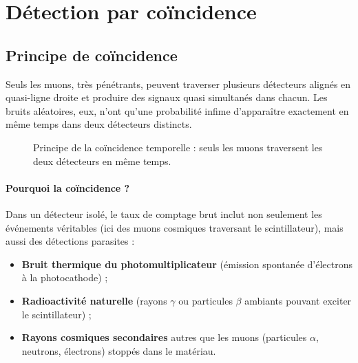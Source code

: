 \documentclass[a4paper,12pt,twoside]{article}
\begin{document}
\section{Détection par coïncidence}

\subsection{Principe de coïncidence}



\begin{center}
\begin{tcolorbox}[colback=blue!5!white, colframe=blue!60!black, title=Principe de la coïncidence]
Seuls les muons, très pénétrants, peuvent traverser plusieurs détecteurs alignés en quasi-ligne droite et produire des signaux quasi simultanés dans chacun. Les bruits aléatoires, eux, n’ont qu’une probabilité infime d’apparaître exactement en même temps dans deux détecteurs distincts.
\end{tcolorbox}
\end{center}

\begin{figure}[H]
    \centering
    \caption{Principe de la coïncidence temporelle : seuls les muons traversent les deux détecteurs en même temps.}
\end{figure}

\paragraph{Pourquoi la coïncidence ?}

Dans un détecteur isolé, le taux de comptage brut inclut non seulement les événements véritables (ici des muons cosmiques traversant le scintillateur), mais aussi des détections parasites :
\begin{itemize}
    \item \textbf{Bruit thermique du photomultiplicateur} (émission spontanée d’électrons à la photocathode) ;
    \item \textbf{Radioactivité naturelle} (rayons $\gamma$ ou particules $\beta$ ambiants pouvant exciter le scintillateur) ;
    \item \textbf{Rayons cosmiques secondaires} autres que les muons (particules $\alpha$, neutrons, électrons) stoppés dans le matériau.
\end{itemize}
\end{document}
